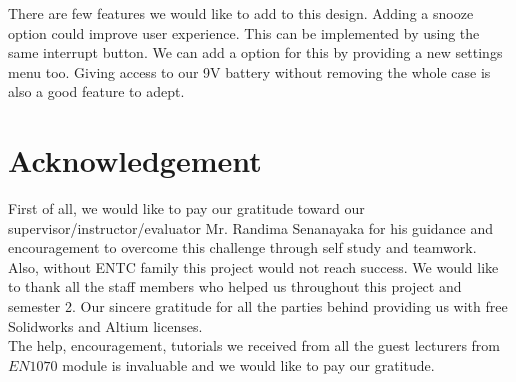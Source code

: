 There are few features we would like to add to this design. Adding a snooze option could improve user experience. This can be implemented by using the same interrupt button. We can add a option for this by providing a new settings menu too. Giving access to our 9V battery without removing the whole case is also a good feature to adept.


{\let\clearpage\relax \chapter{Acknowledgement}

}
First of all, we would like to pay our gratitude toward our supervisor/instructor/evaluator Mr. Randima Senanayaka for his guidance and encouragement to overcome this challenge through self study and teamwork. Also, without ENTC family this project would not reach success. We would like to thank all the staff members who helped us throughout this project and semester 2. Our sincere gratitude for all the parties behind providing us with free Solidworks and Altium licenses.\\
The help, encouragement, tutorials we received from all the guest lecturers from $EN1070$ module is invaluable and we would like to pay our gratitude.
